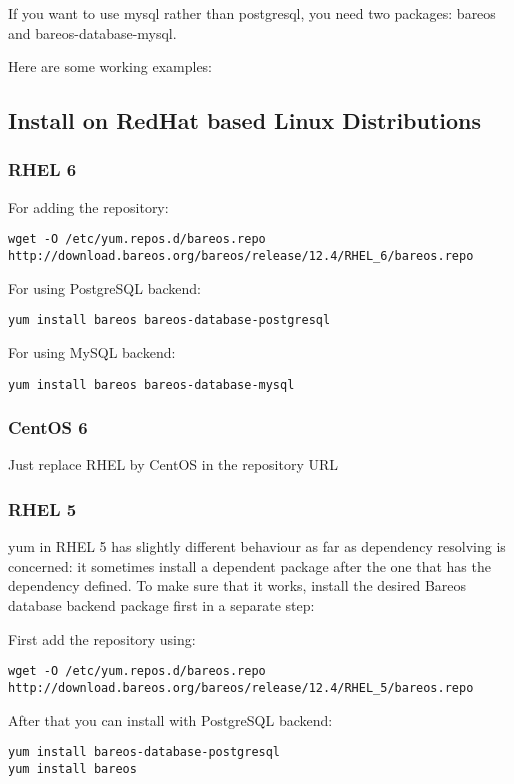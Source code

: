 If you want to use mysql rather than postgresql, you need two packages: bareos and bareos-database-mysql.

Here are some working examples:

\subsection{Install on RedHat based Linux Distributions}
\subsubsection{RHEL 6}

For adding the repository:
\begin{verbatim}
wget -O /etc/yum.repos.d/bareos.repo http://download.bareos.org/bareos/release/12.4/RHEL_6/bareos.repo
\end{verbatim}

For using PostgreSQL backend:
\begin{verbatim}
yum install bareos bareos-database-postgresql
\end{verbatim}

For using MySQL backend:
\begin{verbatim}
yum install bareos bareos-database-mysql
\end{verbatim}

\subsubsection{CentOS 6}

Just replace RHEL by CentOS in the repository URL

\subsubsection{RHEL 5}

yum in RHEL 5 has slightly different behaviour as far as dependency resolving is concerned: it sometimes install a dependent package after the one that has the dependency defined. To make sure that it works, install the desired Bareos database backend package first in a separate step:

First add the repository using:
\begin{verbatim}
wget -O /etc/yum.repos.d/bareos.repo http://download.bareos.org/bareos/release/12.4/RHEL_5/bareos.repo
\end{verbatim}

After that you can install with PostgreSQL backend:
\begin{verbatim}
yum install bareos-database-postgresql
yum install bareos
\end{verbatim}

